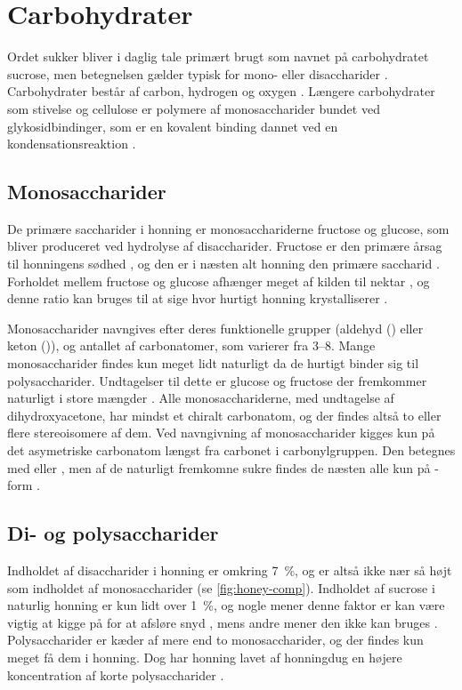 \section{Carbohydrater}\label{sec:sugar}
Ordet sukker bliver i daglig tale primært brugt som navnet på carbohydratet sucrose, men betegnelsen gælder typisk for mono- eller disaccharider \parencite{sugardeff}.
Carbohydrater består af carbon, hydrogen og oxygen \parencite{basisB}.
Længere carbohydrater som stivelse og cellulose er polymere af monosaccharider bundet ved glykosidbindinger, som er en kovalent binding dannet ved en kondensationsreaktion \parencite{sugarbond}.
\subsection{Monosaccharider}
De primære saccharider i honning er monosacchariderne fructose og glucose, som bliver produceret ved hydrolyse af disaccharider.
Fructose er den primære årsag til honningens sødhed \parencite{fuctosehealth}, og den er i næsten alt honning den primære saccharid \parencite{sugarhoney}.
Forholdet mellem fructose og glucose afhænger meget af kilden til nektar \parencite{geohoney}, og denne ratio kan bruges til at sige hvor hurtigt honning krystalliserer \parencite{honeycrystal}.
\par Monosaccharider navngives efter deres funktionelle grupper (aldehyd () eller keton ()), og antallet af carbonatomer, som varierer fra \numrange{3}{8}.
Mange monosaccharider findes kun meget lidt naturligt da de hurtigt binder sig til polysaccharider.
Undtagelser til dette er glucose og fructose der fremkommer naturligt i store mængder \parencite{physwoodplant}.
Alle monosacchariderne, med undtagelse af dihydroxyacetone, har mindst et chiralt carbonatom, og der findes altså to eller flere stereoisomere af dem.
Ved navngivning af monosaccharider kigges kun på det asymetriske carbonatom længst fra carbonet i carbonylgruppen.
Den betegnes med \iupac{\L} eller \iupac{\D}, men af de naturligt fremkomne sukre findes de næsten alle kun på \iupac{\D}-form \parencite{physwoodplant}.
\subsection{Di- og polysaccharider}
Indholdet af disaccharider i honning er omkring \qty{7}{\percent}, og er altså ikke nær så højt som indholdet af monosaccharider (se \cref{fig:honey-comp}).
Indholdet af sucrose i naturlig honning er kun lidt over \qty{1}{\percent}, og nogle mener denne faktor er kan være vigtig at kigge på for at afsløre snyd \parencite{saccharosehoney}, mens andre mener den ikke kan bruges \parencite{biochemprophoney}.
Polysaccharider er kæder af mere end to monosaccharider, og der findes kun meget få dem i honning. Dog har honning lavet af honningdug en højere koncentration af korte polysaccharider \parencite{sugarhoney}.
